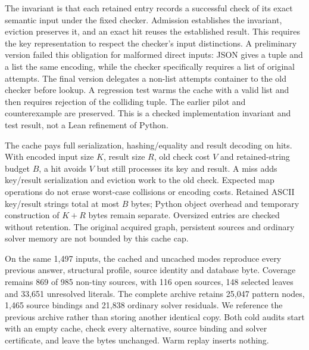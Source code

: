 \documentclass[11pt,a4paper]{article}
\numberwithin{equation}{section}
\theoremstyle{plain}
\theoremstyle{definition}
\theoremstyle{remark}
\begin{document}
The invariant is that each retained entry records a successful check of its exact semantic input under the fixed checker. Admission establishes the invariant, eviction preserves it, and an exact hit reuses the established result. This requires the key representation to respect the checker's input distinctions. A preliminary version failed this obligation for malformed direct inputs: JSON gives a tuple and a list the same encoding, while the checker specifically requires a list of original attempts. The final version delegates a non-list attempts container to the old checker before lookup. A regression test warms the cache with a valid list and then requires rejection of the colliding tuple. The earlier pilot and counterexample are preserved. This is a checked implementation invariant and test result, not a Lean refinement of Python.

The cache pays full serialization, hashing/equality and result decoding on hits. With encoded input size $K$, result size $R$, old check cost $V$ and retained-string budget $B$, a hit avoids $V$ but still processes its key and result. A miss adds key/result serialization and eviction work to the old check. Expected map operations do not erase worst-case collisions or encoding costs. Retained ASCII key/result strings total at most $B$ bytes; Python object overhead and temporary construction of $K+R$ bytes remain separate. Oversized entries are checked without retention. The original acquired graph, persistent sources and ordinary solver memory are not bounded by this cache cap.

On the same 1,497 inputs, the cached and uncached modes reproduce every previous answer, structural profile, source identity and database byte. Coverage remains 869 of 985 non-tiny sources, with 116 open sources, 148 selected leaves and 33,651 unresolved literals. The complete archive retains 25,047 pattern nodes, 1,465 source bindings and 21,838 ordinary solver residuals. We reference the previous archive rather than storing another identical copy. Both cold audits start with an empty cache, check every alternative, source binding and solver certificate, and leave the bytes unchanged. Warm replay inserts nothing.
\end{document}
